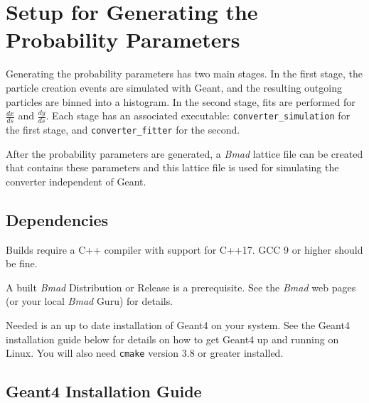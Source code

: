 \documentclass[12pt]{article}
\newcommand{\dxds}{\frac{dx}{ds}}
\newcommand{\dyds}{\frac{dy}{ds}}
\newcommand{\exes}{\texttt{converter\_simulation}\xspace}
\newcommand{\exef}{\texttt{converter\_fitter}\xspace}
\newcommand{\bmad}{\textit{Bmad}\xspace}
\begin{document}
\newpage
\section{Setup for Generating the Probability Parameters}

Generating the probability parameters has two main stages. In the first stage, the particle creation
events are simulated with Geant, and the resulting outgoing particles are binned into a
histogram. In the second stage, fits are performed for $\dxds$ and $\dyds$.  Each stage has an
associated executable: \exes for the first stage, and \exef for the second.

After the probability parameters are generated, a \bmad lattice file can be created that contains
these parameters and this lattice file is used for simulating the converter independent of Geant.

\subsection{Dependencies}
\label{s:deps}

Builds require a C++ compiler with support for C++17. GCC 9 or higher should be fine.

A built \bmad Distribution or Release is a prerequisite. See the \bmad web pages (or your local
\bmad Guru) for details.

Needed is an up to date installation of Geant4 on your system. See the Geant4 installation guide
below for details on how to get Geant4 up and running on Linux.  You will also need \texttt{cmake}
version 3.8 or greater installed.

\subsection{Geant4 Installation Guide}
\end{document}
